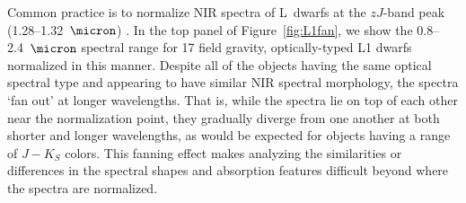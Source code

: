 \documentclass[12pt,preprint]{aastex}
\begin{document}
Common practice is to normalize NIR spectra of L~dwarfs at the $zJ$-band peak (1.28--1.32~$\micron$) \citep[e.g.,][]{Kirkpatrick10}. 
In the top panel of Figure~\ref{fig:L1fan}, we show the 0.8--2.4~$\micron$ spectral range for 17 field gravity, optically-typed L1 dwarfs normalized in this manner.
Despite all of the objects having the same optical spectral type and appearing to have similar NIR spectral morphology, the spectra `fan out' at longer wavelengths. 
That is, while the spectra lie on top of each other near the normalization point, they gradually diverge from one another at both shorter and longer wavelengths, as would be expected for objects having a range of $J-K_S$ colors. 
This fanning effect makes analyzing the similarities or differences in the spectral shapes and absorption features difficult beyond where the spectra are normalized.

\end{document}
